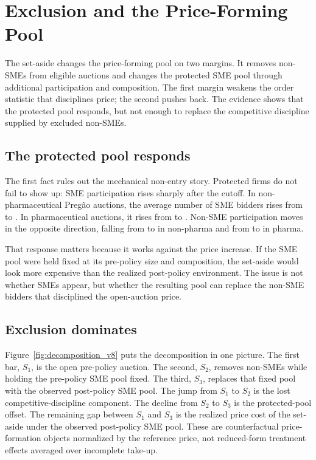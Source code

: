 \section{Exclusion and the Price-Forming Pool}\label{sec:price_formation}

The set-aside changes the price-forming pool on two margins. It removes
non-SMEs from eligible auctions and changes the protected SME pool through
additional participation and composition. The first margin weakens the order
statistic that disciplines price; the second pushes back. The evidence shows
that the protected pool responds, but not enough to replace the competitive
discipline supplied by excluded non-SMEs.

\subsection{The protected pool responds}

The first fact rules out the mechanical non-entry story. Protected firms do
not fail to show up: SME participation rises sharply after the cutoff. In
non-pharmaceutical Preg\~ao auctions, the average number of SME bidders
rises from \bneNsmePreNp{} to \bneNsmePostNp{}. In pharmaceutical auctions,
it rises from \bneNsmePrePh{} to \bneNsmePostPh{}. Non-SME participation
moves in the opposite direction, falling from \bneNnsPreNp{} to
\nonSmePostNp{} in non-pharma and from \bneNnsPrePh{} to \nonSmePostPh{} in
pharma.

That response matters because it works against the price increase. If the
SME pool were held fixed at its pre-policy size and composition, the
set-aside would look more expensive than the realized post-policy
environment. The issue is not whether SMEs appear, but whether the
resulting pool can replace the non-SME bidders that disciplined
the open-auction price.

\subsection{Exclusion dominates}

Figure~\ref{fig:decomposition_v8} puts the decomposition in one picture. The
first bar, $S_1$, is the open pre-policy auction. The second, $S_2$, removes
non-SMEs while holding the pre-policy SME pool fixed. The third, $S_3$,
replaces that fixed pool with the observed post-policy SME pool. The jump
from $S_1$ to $S_2$ is the lost competitive-discipline component. The
decline from $S_2$ to $S_3$ is the protected-pool offset. The remaining gap
between $S_1$ and $S_3$ is the realized price cost of the set-aside under
the observed post-policy SME pool. These are counterfactual price-formation
objects normalized by the reference price, not reduced-form treatment
effects averaged over incomplete take-up.

